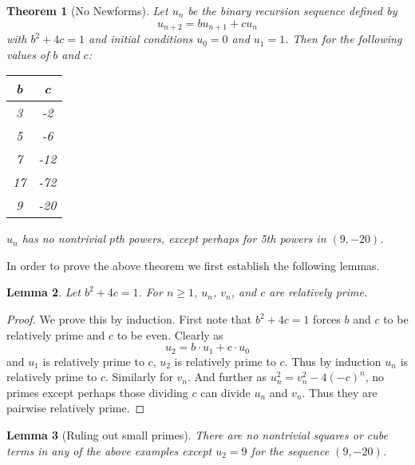 \documentclass[12pt]{amsart}
\newtheorem{thm}{Theorem}[section]
\newtheorem{lem}[thm]{Lemma}
\theoremstyle{definition}
\begin{document}
\begin{thm}[No Newforms]\label{noforms1}
Let $u_n$ be the binary recursion sequence defined by 
\[ u_{n+2} = bu_{n+1} +cu_n \]
with $b^2+4c = 1$ and initial conditions $u_0 = 0$ and $u_1=1$.  Then for the following values of $b$ and $c$:
\begin{center}
\begin{tabular}{c | c }
b & c \\  \hline \hline
3 & -2 \\
5 & -6  \\
7 & -12 \\
17 & -72  \\
9 & -20 \\ \hline \hline
\end{tabular}
\end{center}
$u_n$ has no nontrivial $p$th powers, except perhaps for 5th powers in $(9,-20)$.
\end{thm}

In order to prove the above theorem we first establish the following lemmas.

\begin{lem}\label{relprime}
Let $b^2+4c=1$.  For $n \geq 1$,  $u_n$, $v_n$, and $c$ are relatively prime.
\end{lem}

\begin{proof}
We prove this by induction.  First note that $b^2 +4c = 1$ forces $b$ and $c$ to be relatively prime and $c$ to be even.  Clearly as
\[ u_2 = b \cdot u_1 + c \cdot u_0 \]
and $u_1$ is relatively prime to $c$, $u_2$ is relatively prime to $c$.  Thus by induction $u_n$ is relatively prime to $c$.  Similarly for $v_n$.  And further as $u_n^2  = v_n^2 - 4(-c)^n$, no primes except perhaps those dividing $c$ can divide $u_n$ and $v_n$.  Thus they are pairwise relatively prime.
\end{proof}

\begin{lem}[Ruling out small primes]\label{smallp}
There are no nontrivial squares or cube terms in any of the above examples except $u_2 = 9$ for the sequence $(9,-20)$.
\end{lem}
\end{document}

